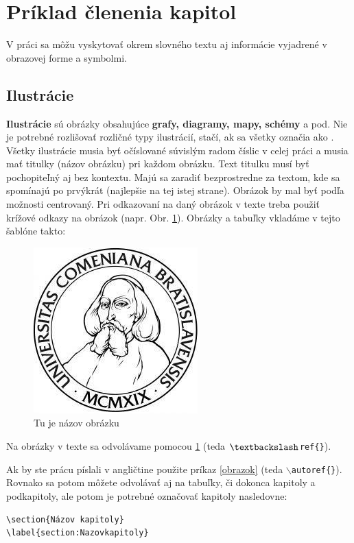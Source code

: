 \section{Príklad členenia kapitol}
V práci sa môžu vyskytovať okrem slovného textu aj informácie vyjadrené v obrazovej forme a symbolmi.

\subsection{Ilustrácie}
\label{Ilustracie}
\textbf{Ilustrácie} sú obrázky obsahujúce {\bf grafy, diagramy, mapy, schémy} a pod. Nie je potrebné rozlišovať rozličné typy ilustrácií, stačí, ak sa všetky označia ako . Všetky ilustrácie musia byť očíslované súvislým radom číslic v celej práci a musia mať titulky (názov obrázku) pri každom obrázku. Text titulku musí byť pochopiteľný aj bez kontextu. Majú sa zaradiť bezprostredne za textom, kde sa spomínajú po prvýkrát (najlepšie na tej istej strane). Obrázok by mal byť podľa možnosti centrovaný. Pri odkazovaní na daný obrázok v texte treba použiť krížové odkazy na obrázok (napr. Obr. \ref{obrazok}). Obrázky a tabuľky vkladáme v tejto šablóne takto:

\begin{figure}[h]
\centering
	\includegraphics[scale=0.5]{logoUK.jpg}
	\caption{Tu je názov obrázku}
	\label{obrazok}
\end{figure}

Na obrázky v texte sa odvolávame pomocou \ref{obrazok} (teda \texttt{$\textbackslash$ref\{\}}). 

Ak by ste prácu píslali v angličtine použite príkaz \autoref{obrazok} (teda \texttt{$\backslash$autoref\{\}}). Rovnako sa potom môžete odvolávať aj na  tabuľky, či dokonca kapitoly a podkapitoly, ale potom je potrebné označovať kapitoly nasledovne:
\begin{verbatim}
\section{Názov kapitoly}
\label{section:Nazovkapitoly}
\end{verbatim}

